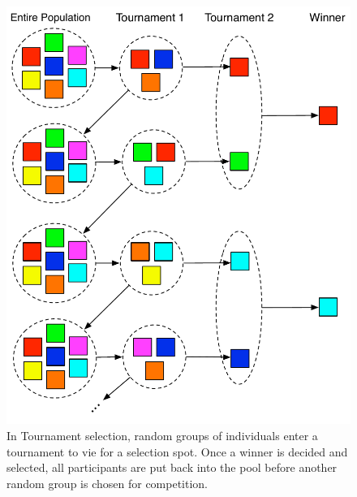 \documentclass[a4paper,12pt]{report} 	%
\numberwithin{figure}{chapter}
\numberwithin{table}{chapter}
\numberwithin{equation}{chapter}
\begin{document}
\begin{flushleft}
\begin{description}
\begin{figure}[h!]
\begin{center}
\includegraphics[scale = 0.7]{DoubleTournamentSelection}
\caption[Tournament Selection]{In Tournament selection, random groups of individuals enter a tournament to vie for a selection spot. Once a winner is decided and selected, all participants are put back into the pool before another random group is chosen for competition.}
\end{center}
\end{figure}
\\
\item 
\end{description}


\end{flushleft}
\end{document}
